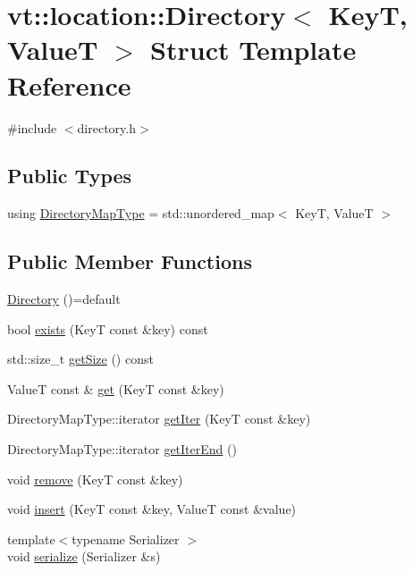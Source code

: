 \hypertarget{structvt_1_1location_1_1_directory}{}\section{vt\+:\+:location\+:\+:Directory$<$ KeyT, ValueT $>$ Struct Template Reference}
\label{structvt_1_1location_1_1_directory}


{\ttfamily \#include $<$directory.\+h$>$}

\subsection*{Public Types}
\begin{DoxyCompactItemize}
\item 
using \hyperlink{structvt_1_1location_1_1_directory_a6a897ff3929eccb2d334eb0b87b53f57}{Directory\+Map\+Type} = std\+::unordered\+\_\+map$<$ KeyT, ValueT $>$
\end{DoxyCompactItemize}
\subsection*{Public Member Functions}
\begin{DoxyCompactItemize}
\item 
\hyperlink{structvt_1_1location_1_1_directory_a166cb46d3274d1bc09e4b852d70172af}{Directory} ()=default
\item 
bool \hyperlink{structvt_1_1location_1_1_directory_aec1cbff73a72fb1be6825bd048f69601}{exists} (KeyT const \&key) const
\item 
std\+::size\+\_\+t \hyperlink{structvt_1_1location_1_1_directory_aa5725f97f3444efc18c8745b747545ac}{get\+Size} () const
\item 
ValueT const  \& \hyperlink{structvt_1_1location_1_1_directory_a7d3271252e69fd8c2c16c702b032bdc8}{get} (KeyT const \&key)
\item 
Directory\+Map\+Type\+::iterator \hyperlink{structvt_1_1location_1_1_directory_ae54fc683860dbfd4145012b93332d70c}{get\+Iter} (KeyT const \&key)
\item 
Directory\+Map\+Type\+::iterator \hyperlink{structvt_1_1location_1_1_directory_a7960b610e733ac8df4417a6181e32fe1}{get\+Iter\+End} ()
\item 
void \hyperlink{structvt_1_1location_1_1_directory_a85c59bd87eecbfabcbd7941e1c1929ae}{remove} (KeyT const \&key)
\item 
void \hyperlink{structvt_1_1location_1_1_directory_a9c4f1322988eb75cb7abd13d977b315f}{insert} (KeyT const \&key, ValueT const \&value)
\item 
{\footnotesize template$<$typename Serializer $>$ }\\void \hyperlink{structvt_1_1location_1_1_directory_a78fb8d36b1ca041d03ddc22dcbb907ad}{serialize} (Serializer \&s)
\end{DoxyCompactItemize}
